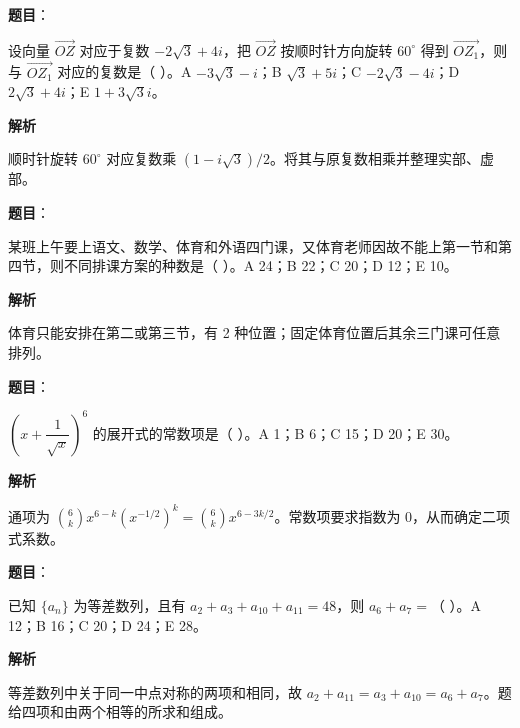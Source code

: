 \begin{answer}

\textbf{题目}：

设向量 $\overrightarrow{OZ}$ 对应于复数 $-2\sqrt3+4i$，把 $\overrightarrow{OZ}$ 按顺时针方向旋转 $60^\circ$ 得到 $\overrightarrow{OZ_1}$，则与 $\overrightarrow{OZ_1}$ 对应的复数是（ ）。A $-3\sqrt3-i$；B $\sqrt3+5i$；C $-2\sqrt3-4i$；D $2\sqrt3+4i$；E $1+3\sqrt3i$。

\textbf{解析}

顺时针旋转 $60^\circ$ 对应复数乘 $(1-i\sqrt3)/2$。将其与原复数相乘并整理实部、虚部。


\end{answer}
\begin{answer}

\textbf{题目}：

某班上午要上语文、数学、体育和外语四门课，又体育老师因故不能上第一节和第四节，则不同排课方案的种数是（ ）。A 24；B 22；C 20；D 12；E 10。

\textbf{解析}

体育只能安排在第二或第三节，有 2 种位置；固定体育位置后其余三门课可任意排列。


\end{answer}
\begin{answer}

\textbf{题目}：

$\left(x+\dfrac1{\sqrt x}\right)^6$ 的展开式的常数项是（ ）。A 1；B 6；C 15；D 20；E 30。

\textbf{解析}

通项为 $\binom6k x^{6-k}(x^{-1/2})^k=\binom6k x^{6-3k/2}$。常数项要求指数为 0，从而确定二项式系数。


\end{answer}
\begin{answer}

\textbf{题目}：

已知 $\{a_n\}$ 为等差数列，且有 $a_2+a_3+a_{10}+a_{11}=48$，则 $a_6+a_7=$（ ）。A 12；B 16；C 20；D 24；E 28。

\textbf{解析}

等差数列中关于同一中点对称的两项和相同，故 $a_2+a_{11}=a_3+a_{10}=a_6+a_7$。题给四项和由两个相等的所求和组成。


\end{answer}

